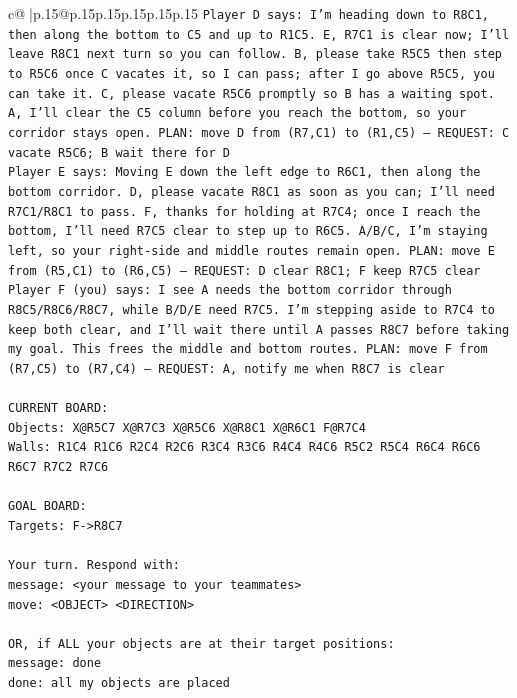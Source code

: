 \documentclass{article}
\begin{document}
{\begin{supertabular}{c@{$\;$}|p{.15\linewidth}@{}p{.15\linewidth}p{.15\linewidth}p{.15\linewidth}p{.15\linewidth}p{.15\linewidth}}
{{{\texttt{Player D says: I'm heading down to R8C1, then along the bottom to C5 and up to R1C5. E, R7C1 is clear now; I'll leave R8C1 next turn so you can follow. B, please take R5C5 then step to R5C6 once C vacates it, so I can pass; after I go above R5C5, you can take it. C, please vacate R5C6 promptly so B has a waiting spot. A, I'll clear the C5 column before you reach the bottom, so your corridor stays open. PLAN: move D from (R7,C1) to (R1,C5) — REQUEST: C vacate R5C6; B wait there for D} \\
\texttt{Player E says: Moving E down the left edge to R6C1, then along the bottom corridor. D, please vacate R8C1 as soon as you can; I’ll need R7C1/R8C1 to pass. F, thanks for holding at R7C4; once I reach the bottom, I’ll need R7C5 clear to step up to R6C5. A/B/C, I’m staying left, so your right{-}side and middle routes remain open. PLAN: move E from (R5,C1) to (R6,C5) — REQUEST: D clear R8C1; F keep R7C5 clear} \\
\texttt{Player F (you) says: I see A needs the bottom corridor through R8C5/R8C6/R8C7, while B/D/E need R7C5. I'm stepping aside to R7C4 to keep both clear, and I'll wait there until A passes R8C7 before taking my goal. This frees the middle and bottom routes. PLAN: move F from (R7,C5) to (R7,C4) — REQUEST: A, notify me when R8C7 is clear} \\
\\ 
\texttt{CURRENT BOARD:} \\
\texttt{Objects: X@R5C7 X@R7C3 X@R5C6 X@R8C1 X@R6C1 F@R7C4} \\
\texttt{Walls: R1C4 R1C6 R2C4 R2C6 R3C4 R3C6 R4C4 R4C6 R5C2 R5C4 R6C4 R6C6 R6C7 R7C2 R7C6} \\
\\ 
\texttt{GOAL BOARD:} \\
\texttt{Targets: F{-}>R8C7} \\
\\ 
\texttt{Your turn. Respond with:} \\
\texttt{message: <your message to your teammates>} \\
\texttt{move: <OBJECT> <DIRECTION>} \\
\\ 
\texttt{OR, if ALL your objects are at their target positions:} \\
\texttt{message: done} \\
\texttt{done: all my objects are placed} \\
            }
        }
    }
     \\ \\


\end{supertabular}}
\end{document}
